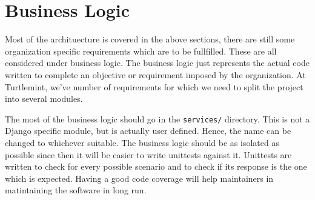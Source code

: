 \section{Business Logic}
Most of the archituecture is covered in the above sections, there are still
some organization specific requirements which are to be fullfilled. These are
all considered under business logic. The business logic just represents the
actual code written to complete an objective or requirement imposed by the
organization. At Turtlemint, we've number of requirements for which we need
to split the project into several modules.

The most of the business logic should go in the \texttt{services/} directory.
This is not a Django specific module, but is actually user defined. Hence, the
name can be changed to whichever suitable. The business logic should be as
isolated as possible since then it will be easier to write unittests against
it. Unittests are written to check for every possible scenario and to check if
its response is the one which is expected. Having a good code coverage will
help maintainers in matintaining the software in long run.
